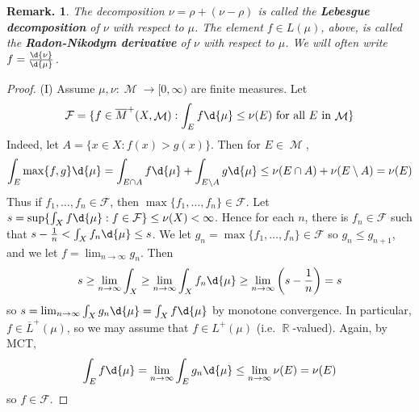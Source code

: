 \documentclass[11pt, a4paper]{memoir}
\DeclareMathOperator{\R}{{\mathbb{R}}}
\theoremstyle{change}
\theoremstyle{plain}
\theoremstyle{nonumberplain}
\newtheorem{remark}{Remark.}
\newtheorem{proof}{Proof}
\DeclareMathOperator{\M}{{\mathcal{M}}}
\begin{document}
\begin{remark}
    The decomposition $\nu=\rho+(\nu-\rho)$ is called the \textbf{Lebesgue decomposition} of $\nu$ with respect to $\mu$.
    The element $f\in L(\mu)$, above, is called the \textbf{Radon-Nikodym derivative} of $\nu$ with respect to $\mu$.
    We will often write $f=\frac{\d{\nu}}{\d{\mu}}$.
\end{remark}
\begin{proof}
    (I) Assume $\mu,\nu:\M\to[0,\infty)$ are finite measures.
    Let
    \begin{equation*}
        \mathcal{F}=\{f\in\overline{M}^+(X,\M):\int_E f\d{\mu}\leq\nu(E)\text{ for all $E$ in $\M$}\}
    \end{equation*}
    Indeed, let $A=\{x\in X:f(x)>g(x)\}$.
    Then for $E\in\M$,
    \begin{align*}
        \int_E\max\{f,g\}\d{\mu}=\int_{E\cap A}f\d{\mu}+\int_{E\setminus A} g\d{\mu}\leq \nu(E\cap A)+\nu(E\setminus A)=\nu(E)
    \end{align*}
    Thus if $f_1,\ldots,f_n\in\mathcal{F}$, then $\max\{f_1,\ldots,f_n\}\in\mathcal{F}$.
    Let $s=\sup\{\int_X f\d{\mu}:f\in\mathcal{F}\}\leq\nu(X)<\infty$.
    Hence for each $n$, there is $f_n\in\mathcal{F}$ such that $s-\frac{1}{n}<\int_X f_n\d{\mu}\leq s$.
    We let $g_n=\max\{f_1,\ldots,f_n\}\in\mathcal{F}$ so $g_n\leq g_{n+1}$, and we let $f=\lim_{n\to\infty}g_n$.
    Then
    \begin{equation*}
        s\geq\lim_{n\to\infty}\int_X \geq\lim_{n\to\infty}\int_X f_n\d{\mu}\geq\lim_{n\to\infty}\left(s-\frac{1}{n}\right)=s
    \end{equation*}
    so $s=\lim_{n\to\infty}\int_X g_n\d{\mu}=\int_X f\d{\mu}$ by monotone convergence.
    In particular, $f\in\overline{L}^+(\mu)$, so we may assume that $f\in L^+(\mu)$ (i.e. $\R$-valued).
    Again, by MCT,
    \begin{align*}
        \int_E f\d{\mu}=\lim_{n\to\infty}\int_E g_n\d{\mu}\leq\lim_{n\to\infty}\nu(E)=\nu(E)
    \end{align*}
    so $f\in\mathcal{F}$.


\end{proof}
\end{document}
